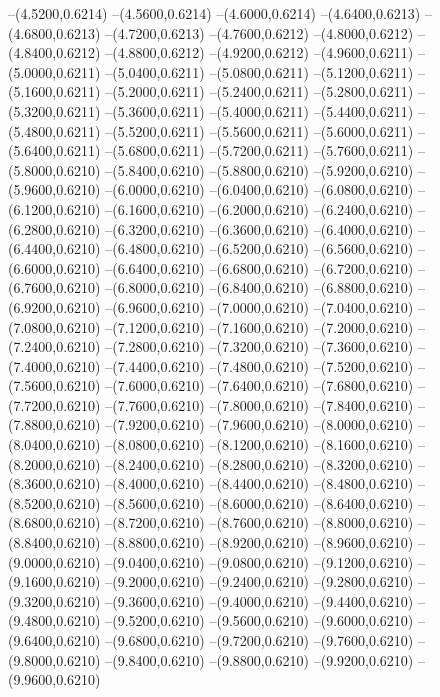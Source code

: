 {	--(4.5200,0.6214)
	--(4.5600,0.6214)
	--(4.6000,0.6214)
	--(4.6400,0.6213)
	--(4.6800,0.6213)
	--(4.7200,0.6213)
	--(4.7600,0.6212)
	--(4.8000,0.6212)
	--(4.8400,0.6212)
	--(4.8800,0.6212)
	--(4.9200,0.6212)
	--(4.9600,0.6211)
	--(5.0000,0.6211)
	--(5.0400,0.6211)
	--(5.0800,0.6211)
	--(5.1200,0.6211)
	--(5.1600,0.6211)
	--(5.2000,0.6211)
	--(5.2400,0.6211)
	--(5.2800,0.6211)
	--(5.3200,0.6211)
	--(5.3600,0.6211)
	--(5.4000,0.6211)
	--(5.4400,0.6211)
	--(5.4800,0.6211)
	--(5.5200,0.6211)
	--(5.5600,0.6211)
	--(5.6000,0.6211)
	--(5.6400,0.6211)
	--(5.6800,0.6211)
	--(5.7200,0.6211)
	--(5.7600,0.6211)
	--(5.8000,0.6210)
	--(5.8400,0.6210)
	--(5.8800,0.6210)
	--(5.9200,0.6210)
	--(5.9600,0.6210)
	--(6.0000,0.6210)
	--(6.0400,0.6210)
	--(6.0800,0.6210)
	--(6.1200,0.6210)
	--(6.1600,0.6210)
	--(6.2000,0.6210)
	--(6.2400,0.6210)
	--(6.2800,0.6210)
	--(6.3200,0.6210)
	--(6.3600,0.6210)
	--(6.4000,0.6210)
	--(6.4400,0.6210)
	--(6.4800,0.6210)
	--(6.5200,0.6210)
	--(6.5600,0.6210)
	--(6.6000,0.6210)
	--(6.6400,0.6210)
	--(6.6800,0.6210)
	--(6.7200,0.6210)
	--(6.7600,0.6210)
	--(6.8000,0.6210)
	--(6.8400,0.6210)
	--(6.8800,0.6210)
	--(6.9200,0.6210)
	--(6.9600,0.6210)
	--(7.0000,0.6210)
	--(7.0400,0.6210)
	--(7.0800,0.6210)
	--(7.1200,0.6210)
	--(7.1600,0.6210)
	--(7.2000,0.6210)
	--(7.2400,0.6210)
	--(7.2800,0.6210)
	--(7.3200,0.6210)
	--(7.3600,0.6210)
	--(7.4000,0.6210)
	--(7.4400,0.6210)
	--(7.4800,0.6210)
	--(7.5200,0.6210)
	--(7.5600,0.6210)
	--(7.6000,0.6210)
	--(7.6400,0.6210)
	--(7.6800,0.6210)
	--(7.7200,0.6210)
	--(7.7600,0.6210)
	--(7.8000,0.6210)
	--(7.8400,0.6210)
	--(7.8800,0.6210)
	--(7.9200,0.6210)
	--(7.9600,0.6210)
	--(8.0000,0.6210)
	--(8.0400,0.6210)
	--(8.0800,0.6210)
	--(8.1200,0.6210)
	--(8.1600,0.6210)
	--(8.2000,0.6210)
	--(8.2400,0.6210)
	--(8.2800,0.6210)
	--(8.3200,0.6210)
	--(8.3600,0.6210)
	--(8.4000,0.6210)
	--(8.4400,0.6210)
	--(8.4800,0.6210)
	--(8.5200,0.6210)
	--(8.5600,0.6210)
	--(8.6000,0.6210)
	--(8.6400,0.6210)
	--(8.6800,0.6210)
	--(8.7200,0.6210)
	--(8.7600,0.6210)
	--(8.8000,0.6210)
	--(8.8400,0.6210)
	--(8.8800,0.6210)
	--(8.9200,0.6210)
	--(8.9600,0.6210)
	--(9.0000,0.6210)
	--(9.0400,0.6210)
	--(9.0800,0.6210)
	--(9.1200,0.6210)
	--(9.1600,0.6210)
	--(9.2000,0.6210)
	--(9.2400,0.6210)
	--(9.2800,0.6210)
	--(9.3200,0.6210)
	--(9.3600,0.6210)
	--(9.4000,0.6210)
	--(9.4400,0.6210)
	--(9.4800,0.6210)
	--(9.5200,0.6210)
	--(9.5600,0.6210)
	--(9.6000,0.6210)
	--(9.6400,0.6210)
	--(9.6800,0.6210)
	--(9.7200,0.6210)
	--(9.7600,0.6210)
	--(9.8000,0.6210)
	--(9.8400,0.6210)
	--(9.8800,0.6210)
	--(9.9200,0.6210)
	--(9.9600,0.6210)
}
